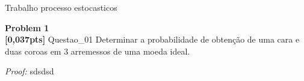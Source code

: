 \documentclass{article}
\newenvironment{problem}[2][Problem]
    { \begin{mdframed}[backgroundcolor=gray!20] \textbf{#1 #2} \\}
    {  \end{mdframed}}
\newenvironment{solution}
    {\textit{Proof:}}
    {}
\begin{document}
\begin{mdframed}[backgroundcolor=blue!20]
Trabalho processo estocasticos
\end{mdframed}

\begin{problem}{1}
\textbf{[0,037pts]} Questao\_01 Determinar a probabilidade de obtenção de uma cara e duas coroas em 3 arremessos de uma moeda ideal.

\end{problem}

\begin{solution}
sdsdsd
\end{solution}
\end{document}
